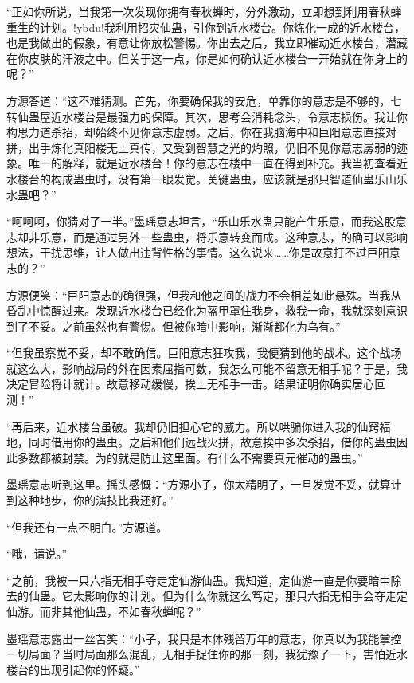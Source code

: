 
\begin{this_body}

“正如你所说，当我第一次发现你拥有春秋蝉时，分外激动，立即想到利用春秋蝉重生的计划。!ybdu!我利用招灾仙蛊，引你到近水楼台。你炼化一成的近水楼台，也是我做出的假象，有意让你放松警惕。你出去之后，我立即催动近水楼台，潜藏在你皮肤的汗液之中。但关于这一点，你是如何确认近水楼台一开始就在你身上的呢？”

方源答道：“这不难猜测。首先，你要确保我的安危，单靠你的意志是不够的，七转仙蛊屋近水楼台是最强力的保障。其次，思考会消耗念头，令意志损伤。我让你构思力道杀招，却始终不见你意志虚弱。之后，你在我脑海中和巨阳意志直接对拼，出手炼化真阳楼无上真传，又受到智慧之光的灼照，仍旧不见你意志孱弱的迹象。唯一的解释，就是近水楼台！你的意志在楼中一直在得到补充。我当初查看近水楼台的构成蛊虫时，没有第一眼发觉。关键蛊虫，应该就是那只智道仙蛊乐山乐水蛊吧？”

“呵呵呵，你猜对了一半。”墨瑶意志坦言，“乐山乐水蛊只能产生乐意，而我这股意志却非乐意，而是通过另外一些蛊虫，将乐意转变而成。这种意志，的确可以影响想法，干扰思维，让人做出违背性格的事情。这么说来……你是故意打不过巨阳意志的？”

方源便笑：“巨阳意志的确很强，但我和他之间的战力不会相差如此悬殊。当我从昏乱中惊醒过来。发现近水楼台已经化为盔甲罩住我身，救我一命，我就深刻意识到了不妥。之前虽然也有警惕。但被你暗中影响，渐渐都化为乌有。”

“但我虽察觉不妥，却不敢确信。巨阳意志狂攻我，我便猜到他的战术。这个战场就这么大，影响战局的外在因素屈指可数，我怎么可能不留意无相手呢？于是，我决定冒险将计就计。故意移动缓慢，挨上无相手一击。结果证明你确实居心叵测！”

“再后来，近水楼台虽破。我却仍旧担心它的威力。所以哄骗你进入我的仙窍福地，同时借用你的蛊虫。之后和他们远战火拼，故意挨中多次杀招，借你的蛊虫因此多数都被封禁。为的就是防止这里面。有什么不需要真元催动的蛊虫。”

墨瑶意志听到这里。摇头感慨：“方源小子，你太精明了，一旦发觉不妥，就算计到这种地步，你的演技比我还好。”

“但我还有一点不明白。”方源道。

“哦，请说。”

“之前，我被一只六指无相手夺走定仙游仙蛊。我知道，定仙游一直是你要暗中除去的仙蛊。它太影响你的计划。但为什么你就这么笃定，那只六指无相手会夺走定仙游。而非其他仙蛊，不如春秋蝉呢？”

墨瑶意志露出一丝苦笑：“小子，我只是本体残留万年的意志，你真以为我能掌控一切局面？当时局面那么混乱，无相手捉住你的那一刻，我犹豫了一下，害怕近水楼台的出现引起你的怀疑。”


\end{this_body}
